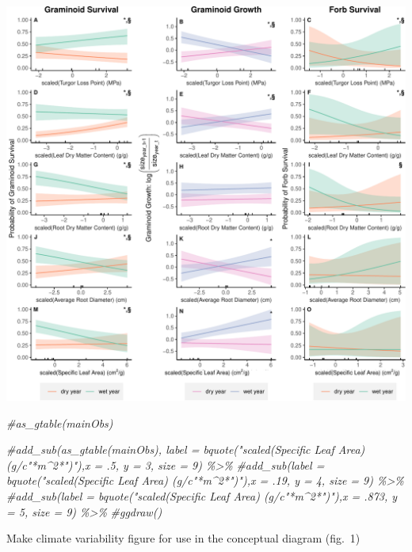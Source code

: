 \documentclass[
]{article}
\newenvironment{Shaded}{\begin{snugshade}}{\end{snugshade}}
\newcommand{\CommentTok}[1]{\textcolor[rgb]{0.56,0.35,0.01}{\textit{#1}}}
\begin{document}
\includegraphics{figures/mainObservationsFig-1.pdf}

\begin{Shaded}
\begin{Highlighting}[]
\CommentTok{\#as\_gtable(mainObs)}

\CommentTok{\#add\_sub(as\_gtable(mainObs), label = bquote("scaled(Specific Leaf Area) (g/c"*m\^{}2*")"),x = .5, y = 3, size = 9) \%\textgreater{}\% }
\CommentTok{\#add\_sub(label = bquote("scaled(Specific Leaf Area) (g/c"*m\^{}2*")"),x = .19, y = 4, size = 9) \%\textgreater{}\% }
\CommentTok{\#add\_sub(label = bquote("scaled(Specific Leaf Area) (g/c"*m\^{}2*")"),x = .873, y = 5, size = 9)  \%\textgreater{}\% }
\CommentTok{\#ggdraw()}
\end{Highlighting}
\end{Shaded}

Make climate variability figure for use in the conceptual diagram
(fig.~1)
\end{document}
